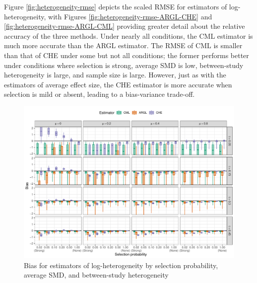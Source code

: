 \documentclass[
  american,
  man, donotrepeattitle,mask,floatsintext]{apa7}
\numberwithin{table}{section}
\numberwithin{equation}{section}
\numberwithin{figure}{section}
\begin{document}
Figure \ref{fig:heterogeneity-rmse} depicts the scaled RMSE for estimators of log-heterogeneity, with Figures \ref{fig:heterogeneity-rmse-ARGL-CHE} and \ref{fig:heterogeneity-rmse-ARGL-CML} providing greater detail about the relative accuracy of the three methods.
Under nearly all conditions, the CML estimator is much more accurate than the ARGL estimator.
The RMSE of CML is smaller than that of CHE under some but not all conditions; the former performs better under conditions where selection is strong, average SMD is low, between-study heterogeneity is large, and sample size is large.
However, just as with the estimators of average effect size, the CHE estimator is more accurate when selection is mild or absent, leading to a bias-variance trade-off.

\begin{figure}
\includegraphics{step-function-selection-models-supplementary-materials_files/figure-latex/heterogeneity-bias-1} \caption{Bias for estimators of log-heterogeneity by selection probability, average SMD, and between-study heterogeneity}\label{fig:heterogeneity-bias}
\end{figure}
\end{document}
